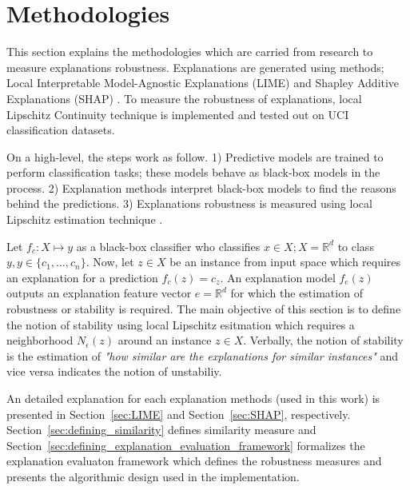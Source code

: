 \documentclass[english]{tktltiki2}
\theoremstyle{definition}
\theoremstyle{remark}
\begin{document}
\section{Methodologies}\label{sec:methodologies} %
This section explains the methodologies which are carried from research to measure explanations robustness. Explanations are generated using methods; Local Interpretable Model-Agnostic Explanations (LIME) and Shapley Additive Explanations (SHAP) \citep{ribeiro2016should,lundberg2017unified}. To measure the robustness of explanations, local Lipschitz Continuity technique \citep{alvarez2018robustness} is implemented and tested out on UCI classification datasets.

On a high-level, the steps work as follow. 1) Predictive models are trained to perform classification tasks; these models behave as black-box models in the process. 2) Explanation methods interpret black-box models to find the reasons behind the predictions. 3) Explanations robustness is measured using local Lipschitz estimation technique \citep{alvarez2018robustness}.

Let $f_c: X \mapsto y$ as a black-box classifier who classifies $x \in X; X = {\mathbb{R}}^d$ to class $y, y \in \{c_1, \dots, c_n\}$. Now, let $z \in X$ be an instance from input space which requires an explanation for a prediction $f_c(z) = c_z$. An explanation model $f_e(z)$ outputs an explanation feature vector $ e = {\mathbb{R}}^d$ for which the estimation of robustness or stability is required. The main objective of this section is to define the notion of stability using local Lipschitz esitmation which requires a neighborhood $N_{\epsilon}(z)$ around an instance $z \in X$. Verbally, the notion of stability is the estimation of \textit{"how similar are the explanations for similar instances"} and vice versa indicates the notion of unstabiliy.

An detailed explanation for each explanation methods (used in this work) is presented in Section~\ref{sec:LIME} and Section~\ref{sec:SHAP}, respectively. Section~\ref{sec:defining_similarity} defines similarity measure and Section~\ref{sec:defining_explanation_evaluation_framework} formalizes the explanation evaluaton framework which defines the robustness measures and presents the algorithmic design used in the implementation.
\end{document}
